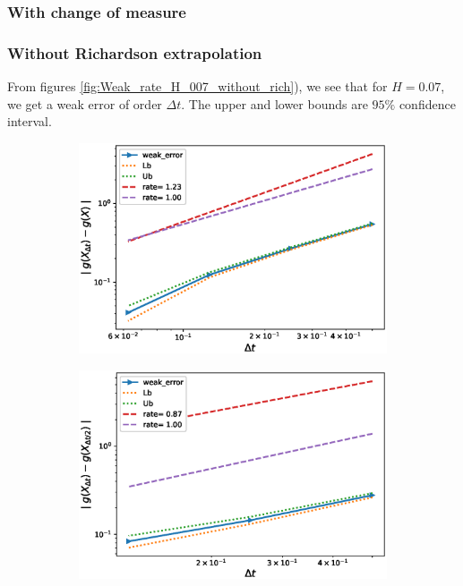 \documentclass[11pt]{article}
\begin{document}
\newpage
\subsubsection{With change of measure}

\subsubsection*{Without Richardson extrapolation}
From figures  \ref{fig:Weak_rate_H_007_without_rich}), we see that for $H=0.07$, we get a weak error of order $\Delta t$. The upper and lower bounds are $95\%$ confidence interval.
\begin{figure}
	\centering
	\begin{subfigure}{.4\textwidth}
		\centering
		\includegraphics[width=1\linewidth]{./figures/rBergomi_weak_error_rates/with_change_measure/without_rich/H_007/weak_convergence_order_Bergomi_H_007_K_1_M_10_5_CI_relative_measure_change_spec}
		\caption{}
		\label{fig:sub3}
	\end{subfigure}%
	\begin{subfigure}{.4\textwidth}
		\centering
		\includegraphics[width=1\linewidth]{./figures/rBergomi_weak_error_rates/with_change_measure/without_rich/H_007/weak_convergence_order_differences_Bergomi_H_007_K_1_M_10_5_CI_relative_measure_change_spec}
		\caption{}
		\label{fig:sub4}
	\end{subfigure}
	

\end{figure}
\end{document}
